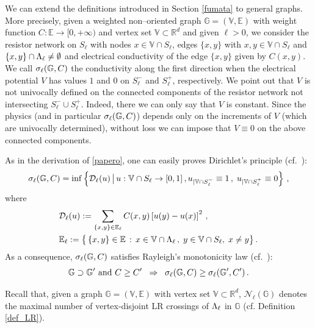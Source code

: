 \documentclass[12pt,a4paper,reqno]{amsart}
\newcommand{\cD}{\ensuremath{\mathcal D}}
\newcommand{\cN}{\ensuremath{\mathcal N}}
\newcommand{\bbE}{{\ensuremath{\mathbb E}} }
\newcommand{\bbG}{{\ensuremath{\mathbb G}} }
\newcommand{\bbR}{{\ensuremath{\mathbb R}} }
\newcommand{\bbV}{{\ensuremath{\mathbb V}} }
\newcommand{\be}{\begin{equation}}
\newcommand{\en}{\end{equation}}
\begin{document}
We can extend the definitions introduced in  Section \ref{fumata} to general  graphs. More precisely, 
given a weighted non--oriented graph $\bbG=(\bbV,\bbE)$ with weight function $C: \bbE\to [0,+\infty)$ and vertex set $\bbV \subset \bbR^d$ and given $\ell>0$, we consider the resistor network on $S_\ell$ with nodes $x\in \bbV \cap S_\ell$, edges $\{x,y\}$ with $x,y\in \bbV \cap S_\ell$ and $\{x,y\}\cap \Lambda_\ell \not = \emptyset$ and electrical conductivity of the edge  $\{x,y\}$ given by $C(x,y)$.
We call $\s_\ell(\bbG, C)$ the conductivity along the first direction when the electrical potential $V$ has values $1$ and $0$ on $S_\ell^-$ and $S_\ell^+$, respectively. We point out that $V$ is not univocally defined on the connected  components of the resistor network not intersecting $S_\ell^-\cup S_\ell^+$. Indeed, there we can only say that $V$ is constant. Since the physics (and in particular $\s_\ell(\bbG, C)$) depends only  on the increments of $V$ (which are  univocally determined), without loss we can impose that  $V\equiv 0$ on the above   connected components.


As in the derivation of \eqref{papero}, one can easily proves Dirichlet's  principle (cf.~\cite[Exercise~1.3.11]{DS}):
\be\label{papero_bis}
\s_\ell (\bbG,C )=\inf \left\{ \cD_\ell(u) \,\big{|} \, u: \bbV \cap S_\ell \to [0,1]\,, u_{|\bbV \cap S_\ell^-} \equiv 1
\,, \; u_{|\bbV \cap S_\ell^+}\equiv0  \right\}\,,
\en
where 
\begin{align*}
&  \cD_\ell(u) := \sum _{\{x,y\} \in \bbE_\ell} C(x,y) \left[ u(y)- u(x) \right]^2\,,\\
& \bbE_\ell:=\bigl\{\,\{x,y\}\in \bbE\,:\, x \in  \bbV \cap \L_\ell\,,\; y \in \bbV \cap S_\ell, \; x\not=y\bigr\}\,.
\end{align*}
As a consequence,   $\s_\ell (\bbG,C)$ satisfies  Rayleigh's monotonicity law (cf.~\cite[Section~1.4]{DS}): 
\be\label{rayleigh_mon_law}
\bbG\supset \bbG' \text{ and } C\geq C'\;\;\Rightarrow \;\; \s_\ell(\bbG, C)\geq \s_\ell(\bbG', C')\,.
\en




\medskip

Recall that, given a graph $\bbG=(\bbV,\bbE)$ with vertex set  $\bbV\subset \bbR^d$,   $\cN_\ell(\bbG)$ denotes  the  maximal number of  vertex-disjoint LR crossings of $\Lambda_\ell$ in $\bbG$ (cf. Definition \ref{def_LR}).
\end{document}
